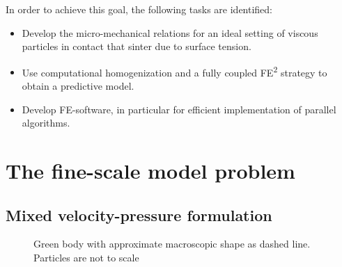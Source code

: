 \documentclass[MikaelDissertation.tex]{subfiles}
\begin{document}
In order to achieve this goal, the following tasks are identified:
\begin{itemize}
 \item Develop the micro-mechanical relations for an ideal setting of viscous particles in contact that sinter due to surface tension.
 \item Use computational homogenization and a fully coupled FE\textsuperscript{2} strategy to obtain a predictive model.
 \item Develop FE-software, in particular for efficient implementation of parallel algorithms.
\end{itemize}

\chapter{The fine-scale model problem}

\section{Mixed velocity-pressure formulation}

\begin{figure}[htpb!]
\centering
{}
\caption{Green body with approximate macroscopic shape as dashed line. Particles are not to scale}
\label{fig:greenbody}
\end{figure}
\end{document}
